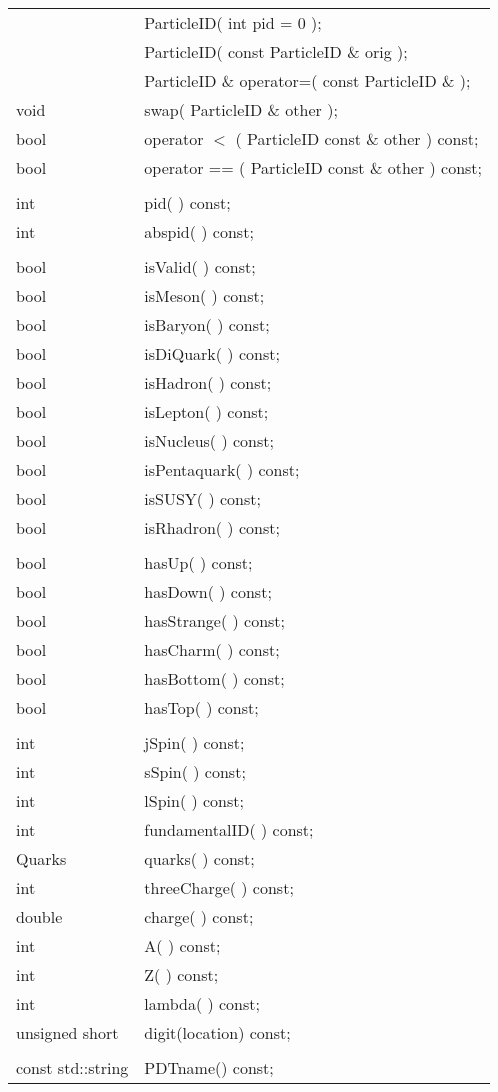 \begin{center}
\begin{tabular}{ll}
 & ParticleID( int pid = 0 ); \\
 & ParticleID( const ParticleID \& orig );  \\
 & ParticleID \& operator=( const ParticleID \& );  \\
void & swap( ParticleID \& other );  \\
bool  & operator $<$  ( ParticleID const \& other ) const;  \\
bool   &operator == ( ParticleID const \& other ) const;  \\
 \\
int   &  pid( )        const;  \\
int & abspid( )        const;  \\
 \\
bool & isValid( )   const; \\
bool & isMeson( )   const;\\
bool  & isBaryon( )  const;\\
bool  & isDiQuark( ) const;\\
bool & isHadron( )  const; \\
bool & isLepton( )  const; \\
bool & isNucleus( )  const; \\
bool & isPentaquark( )  const; \\
bool & isSUSY( )  const; \\
bool & isRhadron( )  const; \\
 \\
bool & hasUp( )      const; \\
bool & hasDown( )    const;\\
bool & hasStrange( ) const;\\
bool & hasCharm( )   const;\\
bool & hasBottom( )  const;\\
bool & hasTop( )     const;\\
 \\
int  & jSpin( )        const; \\
int  & sSpin( )        const;\\
int  & lSpin( )        const; \\
int & fundamentalID( ) const; \\
Quarks & quarks( ) const; \\
int & threeCharge( ) const; \\
double & charge( ) const; \\
int & A( ) const;\\
int & Z( ) const;\\
int & lambda( ) const;\\
unsigned short & digit(location) const; \\
 \\
const std::string & PDTname() const; \\
\end{tabular}
\end{center}

